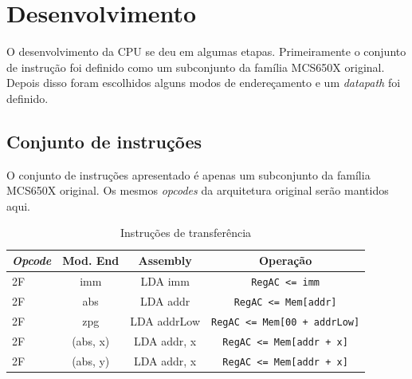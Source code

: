 \documentclass[
	12pt,				  %
	openright,		%
	a4paper,			%
	english,			%
	french,				%
	spanish,			%
	brazil,				%
]{abntex2}
\newcommand{\codenobg}[1]{\texttt{#1}}
\begin{document}
\chapter{Desenvolvimento}

O desenvolvimento da CPU se deu em algumas etapas. Primeiramente o conjunto de
instrução foi definido como um subconjunto da família MCS650X original. Depois
disso foram escolhidos alguns modos de endereçamento e um \emph{datapath} foi
definido.

\section{Conjunto de instruções}
O conjunto de instruções apresentado é apenas um subconjunto da família MCS650X
original. Os mesmos \emph{opcodes} da arquitetura original serão mantidos aqui.

\begin{table}[htb]
	\centering
	\ABNTEXfontereduzida
	\caption{Instruções de transferência} \label{tab:is:transfer}
	\begin{tabular}{|l|c|c|c|}
		\hline
		\textbf{\emph{Opcode}} & \textbf{Mod. End} & \textbf{Assembly} & \textbf{Operação}                     \\ \hline
		2F                     & imm               & LDA imm           & \codenobg{RegAC <= imm}               \\ \hline
		2F                     & abs               & LDA addr          & \codenobg{RegAC <= Mem[addr]}         \\ \hline
		2F                     & zpg               & LDA addrLow       & \codenobg{RegAC <= Mem[00 + addrLow]} \\ \hline
		2F                     & (abs, x)          & LDA addr, x       & \codenobg{RegAC <= Mem[addr + x]}     \\ \hline
		2F                     & (abs, y)          & LDA addr, x       & \codenobg{RegAC <= Mem[addr + x]}     \\ \hline
	\end{tabular}
\end{table}
\end{document}
